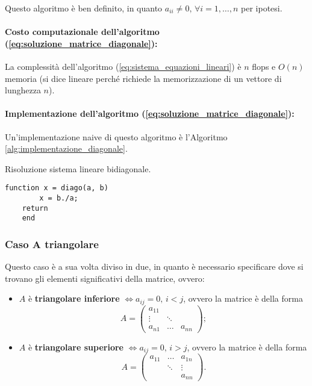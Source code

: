 Questo algoritmo è ben definito, in quanto $a_{ii}\neq 0,\, \forall i=1,\hdots,n$ per ipotesi. 

\paragraph{Costo computazionale dell'algoritmo (\ref{eq:soluzione_matrice_diagonale}):} La complessità dell'algoritmo (\ref{eq:sistema_equazioni_lineari}) è $n$ flops e $O(n)$ memoria (si dice lineare perché richiede la memorizzazione di un vettore di lunghezza $n$).

\paragraph{Implementazione dell'algoritmo (\ref{eq:soluzione_matrice_diagonale}):} Un'implementazione naive di questo algoritmo è l'Algoritmo \ref{alg:implementazione_diagonale}.

\begin{algorithm}\caption{Risoluzione sistema lineare bidiagonale.}\label{alg:implementazione_diagonale}
    \begin{lstlisting}[style=Matlab-editor]
    function x = diago(a, b)
    	x = b./a;
    return
    end
    \end{lstlisting}
\end{algorithm} 

\subsubsection{Caso \texorpdfstring{$\boldsymbol A$}{A} triangolare}
Questo caso è a sua volta diviso in due, in quanto è necessario specificare dove si trovano gli elementi significativi della matrice, ovvero:
\begin{itemize}
    \item $A$ è \textbf{triangolare inferiore} $\iff a_{ij}=0,\, i<j$, ovvero la matrice è della forma 
        \begin{equation*}
            A=
            \begin{pmatrix}
                a_{11} & & \\
                \vdots & \ddots & \\
                a_{n1} & \hdots & a_{nn}
            \end{pmatrix};
    \end{equation*}
    \item $A$ è \textbf{triangolare superiore} $\iff a_{ij}=0,\, i>j$, ovvero la matrice è della forma
    \begin{equation*}
        A=
        \begin{pmatrix}
            a_{11} & \hdots & a_{1n}\\
                &\ddots & \vdots\\
             & & a_{nn}
        \end{pmatrix}.
    \end{equation*}
\end{itemize}

